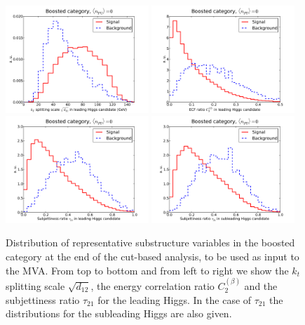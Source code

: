 \begin{figure}[t]
  \begin{center}
    \includegraphics[width=0.48\textwidth]{plots/split12_h1_C1_boost.pdf} 
  \includegraphics[width=0.48\textwidth]{plots/EEC_C2_h0_C1_boost.pdf}
  \includegraphics[width=0.48\textwidth]{plots/tau21_h0_C1_boost.pdf}
  \includegraphics[width=0.48\textwidth]{plots/tau21_h1_C1_boost.pdf}
  \caption{\small Distribution of representative substructure variables
    in the boosted category at the end of the cut-based
    analysis, to be used as input to the MVA.
    From top to bottom and from left to right we show  the
    $k_t$ splitting scale $\sqrt{d_{12}}$,
    the energy correlation ratio $C_2^{(\beta)}$
    and the  subjettiness ratio $\tau_{21}$ for the leading
    Higgs.
    In the case of 
    $\tau_{21}$  the distributions for the subleading Higgs are also given.
 }
\label{fig:mva_substructure_1}
\end{center}
\end{figure}

